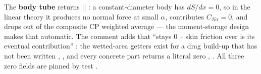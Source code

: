 The \textbf{body tube} returns \cppinline|{}| : a
constant-diameter body has $dS/dx = 0$, so in the linear theory it produces no normal force
at small $\alpha$, contributes $C_{N\alpha} = 0$, and drops out of the composite CP weighted
average --- the moment-storage design makes that automatic. The comment adds that 
``stays 0 -- skin friction over  is its eventual contribution''
: the wetted-area getters exist for a drag build-up that
has not been written , , and
every concrete part returns a literal zero 
, . All three zero
fields are pinned by test .

